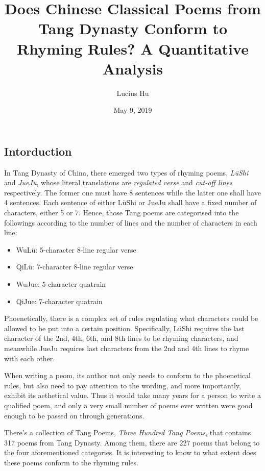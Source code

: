 \documentclass[]{article}
\title{Does Chinese Classical Poems from Tang Dynasty Conform to Rhyming Rules?
A Quantitative Analysis}
\author{Lucius Hu}
\date{May 9, 2019}
\providecommand{\tightlist}{%
  \setlength{\itemsep}{0pt}\setlength{\parskip}{0pt}}
\begin{document}
\maketitle

\hypertarget{intorduction}{%
\subsection{Intorduction}\label{intorduction}}

In Tang Dynasty of China, there emerged two types of rhyming poems,
\emph{LüShi} and \emph{JueJu}, whose literal translations are
\emph{regulated verse} and \emph{cut-off lines} respectively. The former
one must have 8 sentences while the latter one shall have 4 sentences.
Each sentence of either LüShi or JueJu shall have a fixed number of
characters, either 5 or 7. Hence, those Tang poems are categorised into
the followings according to the number of lines and the number of
characters in each line:

\begin{itemize}
\tightlist
\item
  WuLü: 5-character 8-line regular verse
\item
  QiLü: 7-character 8-line regular verse
\item
  WuJue: 5-character quatrain
\item
  QiJue: 7-character quatrain
\end{itemize}

Phoenetically, there is a complex set of rules regulating what
characters could be allowed to be put into a certain position.
Specifically, LüShi requires the last character of the 2nd, 4th, 6th,
and 8th lines to be rhyming characters, and meanwhile JueJu requires
last characters from the 2nd and 4th lines to rhyme with each other.

When writing a peom, its author not only needs to conform to the
phoenetical rules, but also need to pay attention to the wording, and
more importantly, exhibit its aethetical value. Thus it would take many
years for a person to write a qualified poem, and only a very small
number of poems ever written were good enough to be passed on through
generations.

There's a collection of Tang Poems, \emph{Three Hundred Tang Poems},
that contains 317 poems from Tang Dynasty. Among them, there are 227
poems that belong to the four aforementioned categories. It is
interesting to know to what extent does these poems conform to the
rhyming rules.
\end{document}
